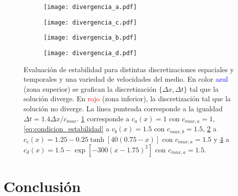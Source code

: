 \documentclass[aps,prb,twocolumn,superscriptaddress,floatfix,longbibliography,10pt]{revtex4-2}
\newcounter{para}
\begin{document}
\begin{figure}
  \centering
  \begin{subfigure}[b]{0.45\textwidth}
      \centering
      \texttt{[image: divergencia\_a.pdf]}
      \caption{\label{fig:divergencia_a}}
  \end{subfigure}
  \hfill
  \begin{subfigure}[b]{0.45\textwidth}
      \centering
      \texttt{[image: divergencia\_c.pdf]}
      \caption{\label{fig:divergencia_b}}
  \end{subfigure}
  \hfill
  \begin{subfigure}[b]{0.45\textwidth}
      \centering
      \texttt{[image: divergencia\_b.pdf]}
      \caption{\label{fig:divergencia_c}}
  \end{subfigure}
  \hfill
  \begin{subfigure}[b]{0.45\textwidth}
      \centering
      \texttt{[image: divergencia\_d.pdf]}
      \caption{\label{fig:divergencia_d}}
  \end{subfigure}
     \caption{Evaluación de estabilidad para distintas discretizaciones espaciales y temporales y una variedad de velocidades del medio. En color \textcolor{blue}{azul} (zona superior) se grafican la discretización $\{\Delta x, \Delta t \}$ tal que la solución diverge. En \textcolor{red}{rojo} (zona inferior), la discretización tal que la solución no diverge. La línea punteada corresponde a la igualdad $\Delta t = 1.4 \Delta x / c_{max}$. \ref{fig:divergencia_a} corresponde a $c_a(x) = 1$ con $c_{max,a} = 1$, \ref{eq:condicion_estabilidad} a $c_b(x) = 1.5$ con $c_{max,b} = 1.5$, \ref{fig:divergencia_b} a $c_c(x) = 1.25 -0.25 \tanh{[40(0.75-x)]}$ con $c_{max,a} = 1.5$ y \ref{fig:divergencia_d} a $c_d(x) = 1.5 - \exp{[-300(x-1.75)^2]}$ con $c_{max,a} = 1.5$.}
     \label{fig:divergencias}
\end{figure}

\twocolumngrid

\hfill

\hfill

\newpage

\section{Conclusión}
\end{document}
